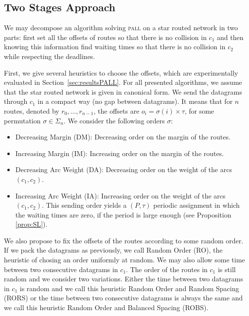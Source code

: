 \documentclass[a4paper,10pt]{journal}
\newcommand\pall{\textsc{pall}\xspace}
\begin{document}
    
     \subsection{Two Stages Approach}
     
      We may decompose an algorithm solving \pall on a star routed network in two parts: first set all the offsets of routes so that there is no collision in $c_1$ and then knowing this information find waiting times so that there is no collision in $c_2$ while respecting the deadlines. 
      
     First, we give several heuristics to choose the offsets, which are experimentally evaluated in Section~\ref{sec:resultsPALL}. For all presented algorithms, we assume that the star routed network is given in canonical form. 
      We send the datagrams through $c_1$ in a compact way (no gap between datagrams). It means that for $n$ routes, denoted by $r_0, \dots, r_{n-1}$, the offsets are $o_i = \sigma(i) \times \tau$, for some permutation $\sigma \in \Sigma_n$. We consider the following orders $\sigma$: 
	
	\begin{itemize}
	 \item Decreasing Margin (DM): Decreasing order on the margin of the routes.
	 \item Increasing Margin (IM): Increasing order on the margin of the routes. 
	 \item Decreasing Arc Weight (DA): Decreasing order on the weight of the arcs $(c_1,c_2)$.
	 \item Increasing Arc Weight (IA): Increasing order on the weight of the arcs $(c_1,c_2)$. This sending order yields a $(P,\tau)$ periodic assignment in which the waiting times are zero, if the period is large enough (see Proposition \ref{prop:SL}).
	\end{itemize}

    We also propose to fix the offsets of the routes according to some random order.
    If we pack the datagrams as previously, we call Random Order (RO), the heuristic of chosing an order
    uniformly at random. We may also allow some time between two consecutive datagrams in $c_1$. The order of the routes in $c_1$ is still random and we consider two variations. Either the time between two datagrams in $c_1$ is random and we call this heuristic Random Order and Random Spacing (RORS) or the time between two consecutive datagrams is always the same and we call this heuristic Random Order and Balanced Spacing (ROBS).
 	
\end{document}
